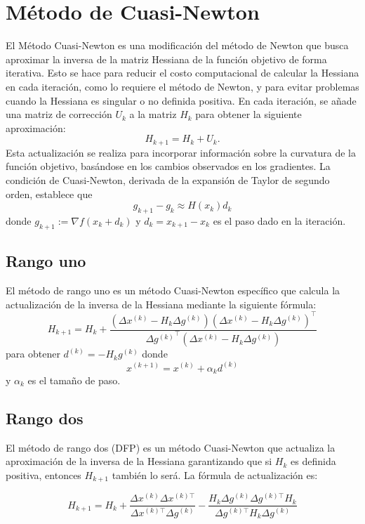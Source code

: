 \section{Método de Cuasi-Newton}

El Método Cuasi-Newton es una modificación del método de Newton que busca aproximar la inversa de la matriz Hessiana de la función objetivo de forma iterativa. Esto se hace para reducir el costo computacional de calcular la Hessiana en cada iteración, como lo requiere el método de Newton, y para evitar problemas cuando la Hessiana es singular o no definida positiva. En cada iteración, se añade una matriz de corrección $U_k$ a la matriz $H_k$ para obtener la siguiente aproximación:
$$H_{k+1} = H_k + U_k.$$
\newpage\noindent
Esta actualización se realiza para incorporar información sobre la curvatura de la función objetivo, basándose en los cambios observados en los gradientes. La condición de Cuasi-Newton, derivada de la expansión de Taylor de segundo orden, establece que
$$g_{k+1} - g_k \approx H(x_k) d_k$$
donde $g_{k + 1} := \nabla f(x_k + d_k)$ y $d_k = x_{k+1} - x_k$ es el paso dado en la iteración.

\subsection{Rango uno}

El método de rango uno es un método Cuasi-Newton específico que calcula la actualización de la inversa de la Hessiana mediante la siguiente fórmula:
$$H_{k+1} = H_k + \frac{\left(\Delta x^{(k)} - H_k \Delta g^{(k)}\right) \left(\Delta x^{(k)} - H_k \Delta g^{(k)}\right)^{\top}}{\Delta\left. g^{(k)} \right.^{\top} \left(\Delta x^{(k)} - H_k \Delta g^{(k)}\right)}$$
para obtener $d^{(k)} = -H_k g^{(k)}$ donde
$$x^{(k+1)} = x^{(k)} + \alpha_k d^{(k)}$$
y $\alpha_k$ es el tamaño de paso.

\subsection{Rango dos}
El método de rango dos (DFP) es un método Cuasi-Newton que actualiza la aproximación de la inversa de la Hessiana garantizando que si $H_k$ es definida positiva, entonces $H_{k+1}$ también lo será. La fórmula de actualización es:

\[
H_{k+1} = H_k + \frac{\Delta x^{(k)}\Delta x^{(k)\top}}{\Delta x^{(k)\top}\Delta g^{(k)}} - \frac{H_k \Delta g^{(k)} \Delta g^{(k)\top} H_k}{\Delta g^{(k)\top} H_k \Delta g^{(k)}}
\]

